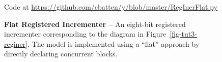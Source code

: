 
\begin{figure}

  

  \centerline{\small Code at
    \url{https://github.com/cbatten/y/blob/master/RegIncrFlat.py}}

  \caption{\textbf{Flat Registered Incrementer --} An eight-bit
    registered incrementer corresponding to the diagram in
    Figure~\ref{fig-tut3-regincr}. The model is implemented using a
    ``flat'' approach by directly declaring concurrent blocks.}
  \label{code-tut3-regincr-flat}

\end{figure}

